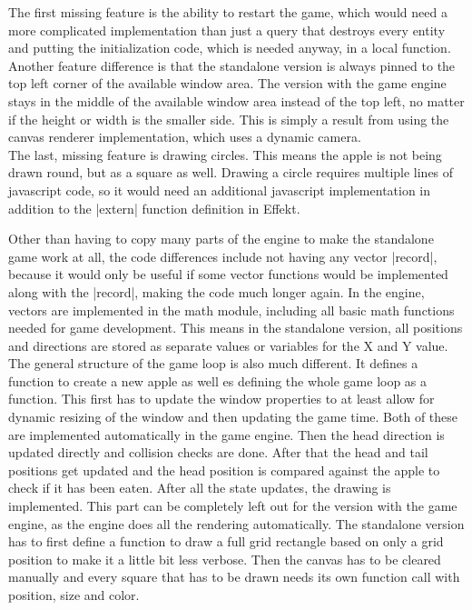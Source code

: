 The first missing feature is the ability to restart the game, which would need a more complicated implementation than just a query that destroys every entity and putting the initialization code, which is needed anyway, in a local function.\\
Another feature difference is that the standalone version is always pinned to the top left corner of the available window area. The version with the game engine stays in the middle of the available window area instead of the top left, no matter if the height or width is the smaller side. This is simply a result from using the canvas renderer implementation, which uses a dynamic camera.\\
The last, missing feature is drawing circles. This means the apple is not being drawn round, but as a square as well. Drawing a circle requires multiple lines of javascript code, so it would need an additional javascript implementation in addition to the |extern| function definition in Effekt.

Other than having to copy many parts of the engine to make the standalone game work at all, the code differences include not having any vector |record|, because it would only be useful if some vector functions would be implemented along with the |record|, making the code much longer again. In the engine, vectors are implemented in the math module, including all basic math functions needed for game development. This means in the standalone version, all positions and directions are stored as separate values or variables for the X and Y value.\\
The general structure of the game loop is also much different. It defines a function to create a new apple as well es defining the whole game loop as a function. This first has to update the window properties to at least allow for dynamic resizing of the window and then updating the game time. Both of these are implemented automatically in the game engine. Then the head direction is updated directly and collision checks are done. After that the head and tail positions get updated and the head position is compared against the apple to check if it has been eaten. After all the state updates, the drawing is implemented. This part can be completely left out for the version with the game engine, as the engine does all the rendering automatically. The standalone version has to first define a function to draw a full grid rectangle based on only a grid position to make it a little bit less verbose. Then the canvas has to be cleared manually and every square that has to be drawn needs its own function call with position, size and color.

